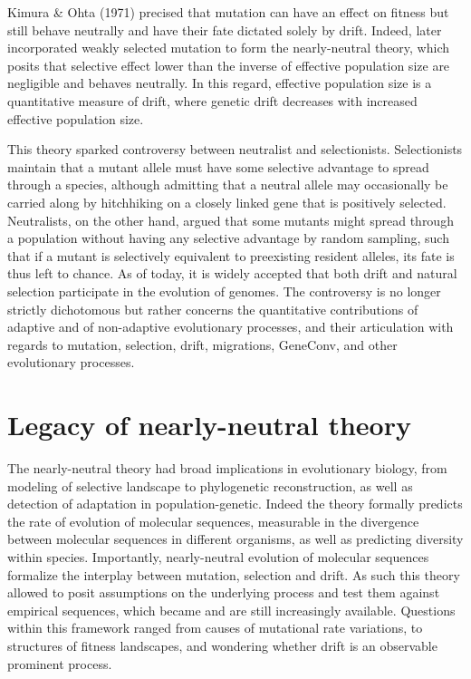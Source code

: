 Kimura \& Ohta (1971) precised that mutation can have an effect on fitness but still behave neutrally and have their fate dictated solely by drift.
Indeed, \citet{ohta1973slightly} later incorporated weakly selected mutation to form the \gls{nearly-neutral} theory, which posits that selective effect lower than the inverse of effective population size are negligible and behaves neutrally.
In this regard, effective population size is a quantitative measure of drift, where genetic drift decreases with increased effective population size.

This theory sparked controversy between neutralist and selectionists.
Selectionists maintain that a mutant \gls{allele} must have some selective advantage to spread through a species, although admitting that a \gls{neutral} \gls{allele} may occasionally be carried along by hitchhiking on a closely linked gene that is positively selected.
Neutralists, on the other hand, argued that some mutants might spread through a population without having any selective advantage by random sampling, such that if a mutant is selectively equivalent to preexisting resident \glspl{allele}, its fate is thus left to chance.
As of today, it is widely accepted that both \gls{drift} and natural selection participate in the evolution of genomes.
The controversy is no longer strictly dichotomous but rather concerns the quantitative contributions of adaptive and of non-adaptive evolutionary processes, and their articulation with regards to mutation, selection, drift, migrations, \gls{GeneConv}, and other evolutionary processes.

\section{Legacy of nearly-neutral theory}

The \gls{nearly-neutral} theory had broad implications in evolutionary biology, from modeling of selective landscape to phylogenetic reconstruction, as well as detection of adaptation in population-genetic.
Indeed the theory formally predicts the rate of evolution of molecular sequences, measurable in the divergence between molecular sequences in different organisms, as well as predicting diversity within species.
Importantly, \gls{nearly-neutral} evolution of molecular sequences formalize the interplay between mutation, selection and drift.
As such this theory allowed to posit assumptions on the underlying process and test them against empirical sequences, which became and are still increasingly available.
Questions within this framework ranged from causes of mutational rate variations, to structures of fitness landscapes, and wondering whether drift is an observable prominent process.

